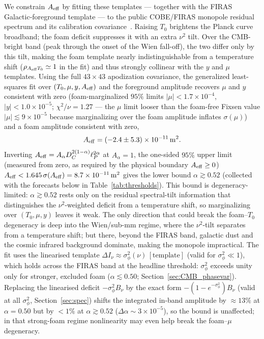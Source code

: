 \documentclass[aps,prd,onecolumn,amsmath,amssymb]{revtex4-2}
\begin{document}
We constrain $A_{\rm eff}$ by fitting these templates --- together with
the FIRAS Galactic-foreground template --- to the public COBE/FIRAS
monopole residual spectrum and its calibration
covariance~\cite{Fixsen1996}.  Raising $T_0$ brightens the Planck curve
broadband; the foam deficit suppresses it with an extra $\nu^2$ tilt.
Over the CMB-bright band (peak through the onset of the Wien fall-off),
the two differ only by this tilt, making the foam template nearly
indistinguishable from a temperature shift
($\rho_{A_{\rm eff}T_0}\simeq 1$ in the fit) and thus strongly collinear
with the $y$ and $\mu$ templates.  Using the
full $43\times43$ apodization covariance, the generalized
least-squares fit over $(T_0,\mu,y,A_{\rm eff})$ and the foreground
amplitude recovers $\mu$ and $y$ consistent with zero (foam-marginalized
$95\%$ limits $|\mu|<1.7\times10^{-4}$, $|y|<1.0\times10^{-5}$;
$\chi^2/\nu=1.27$ --- the $\mu$ limit looser than the foam-free Fixsen
value $|\mu|\lesssim9\times10^{-5}$ because marginalizing over the foam
amplitude inflates $\sigma(\mu)$) and a foam
amplitude consistent with zero,
\begin{equation}
  A_{\rm eff}=(-2.4\pm5.3)\times10^{-11}\,{\rm m}^2 .
  \label{eq:Aeff_firas}
\end{equation}
Inverting $A_{\rm eff}=A_\alpha D_C^{2(1-\alpha)}\ell_P^{2\alpha}$
at $A_\alpha=1$, the one-sided $95\%$ upper limit (measured from zero, as
required by the physical boundary $A_{\rm eff}\geq0$)
$A_{\rm eff}<1.645\,\sigma(A_{\rm eff})=8.7\times10^{-11}\,{\rm m}^2$ gives the lower bound
$\alpha\gtrsim 0.52$ (collected with the forecasts below
in Table~\ref{tab:thresholds}).  This bound is degeneracy-limited: $\alpha\gtrsim0.52$ rests only on the
residual spectral-tilt information that distinguishes the
$\nu^2$-weighted deficit from a temperature shift, so marginalizing over
$(T_0,\mu,y)$ leaves it weak.
The only direction that could break the
foam--$T_0$ degeneracy is deep into the Wien/sub-mm regime, where the
$\nu^2$-tilt separates from a temperature shift; but there, beyond the
FIRAS band, galactic dust and the cosmic infrared background dominate,
making the monopole impractical.  The fit uses the linearised template
$\Delta I_\nu\approx\sigma_\phi^2(\nu)\,[\text{template}]$ (valid for
$\sigma_\phi^2\ll1$), which holds across the FIRAS band at the headline
threshold: $\sigma_\phi^2$ exceeds unity only for stronger, excluded foam
($\alpha\lesssim0.50$; Section~\ref{sec:CMB_phasevar}).  Replacing the
linearised deficit $-\sigma_\phi^2 B_\nu$ by the exact form
$-(1-e^{-\sigma_\phi^2})B_\nu$ (valid at all $\sigma_\phi^2$,
Section~\ref{sec:spec}) shifts the integrated in-band amplitude by
$\approx13\%$ at $\alpha=0.50$ but by $<1\%$ at $\alpha\gtrsim0.52$
($\Delta\alpha\sim3\times10^{-5}$), so the bound is unaffected; in that
strong-foam regime nonlinearity may even help break the foam--$\mu$
degeneracy.
\end{document}
